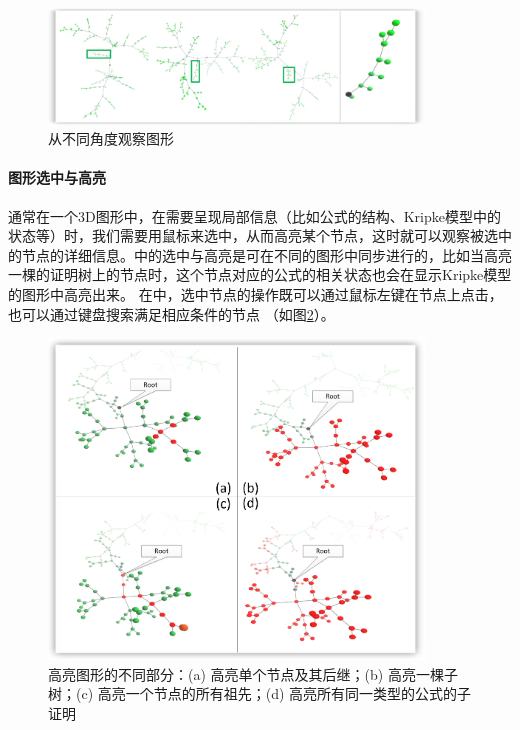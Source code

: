 \begin{figure}[h!]
	\centering
	\includegraphics[width=10cm]{Img/phi_prooftreegraph_angles.png}
	\caption{从不同角度观察图形}
	\label{vmdv:prooftree:different:angle}
\end{figure}
\paragraph{图形选中与高亮}
通常在一个3D图形中，在需要呈现局部信息（比如公式的结构、Kripke模型中的状态等）时，我们需要用鼠标来选中，从而高亮某个节点，这时就可以观察被选中的节点的详细信息。中的选中与高亮是可在不同的图形中同步进行的，比如当高亮一棵\sctlprov{}的证明树上的节点时，这个节点对应的公式的相关状态也会在显示Kripke模型的图形中高亮出来。 在中，选中节点的操作既可以通过鼠标左键在节点上点击，也可以通过键盘搜索满足相应条件的节点 （如图\ref{vmdv:prooftree:high:different}）。
\begin{figure}[h!]
	\centering
	\includegraphics[width=10cm]{Img/high_different.png}
	\caption{高亮图形的不同部分：(a) 高亮单个节点及其后继；(b) 高亮一棵子树；(c) 高亮一个节点的所有祖先；(d) 高亮所有同一类型的公式的子证明}
	\label{vmdv:prooftree:high:different}
\end{figure}
